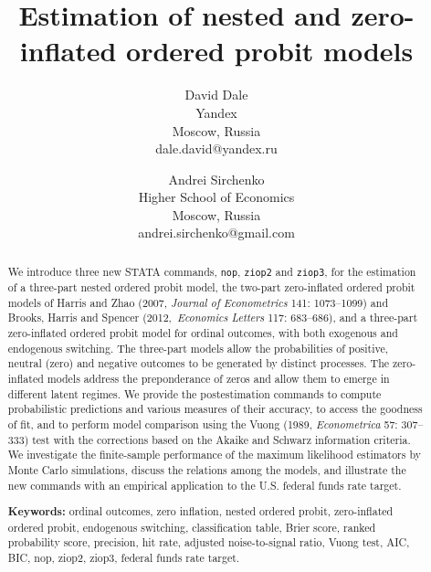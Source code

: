 \documentclass[letterpaper,fleqn,12pt]{article}
\begin{document}
\title{Estimation of nested and zero-inflated ordered probit models\\
\bigskip }
\date{}
\author{David Dale \\
Yandex\\
Moscow, Russia\\
dale.david@yandex.ru \and Andrei Sirchenko \\
Higher School of Economics\\
Moscow, Russia\\
andrei.sirchenko@gmail.com}
\maketitle

\begin{abstract}
We introduce three new STATA commands, \texttt{nop}, \texttt{ziop2} and 
\texttt{ziop3}, for the estimation of a three-part nested ordered probit
model, the two-part zero-inflated ordered probit models of Harris and Zhao
(2007, \textit{Journal of Econometrics }141: 1073--1099) and Brooks, Harris
and Spencer (2012,\ \textit{Economics Letters} 117: 683--686), and a
three-part zero-inflated ordered probit model for ordinal outcomes, with
both exogenous and endogenous switching. The three-part models allow the
probabilities of positive, neutral (zero) and negative outcomes to be
generated by distinct processes. The zero-inflated models address the
preponderance of zeros and allow them to emerge in different latent regimes.
We provide the postestimation commands to compute probabilistic predictions
and various measures of their accuracy, to access the goodness of fit, and
to perform model comparison using the Vuong (1989, \textit{Econometrica} 57:
307--333) test with the corrections based on the Akaike and Schwarz
information criteria. We investigate the finite-sample performance of the
maximum likelihood estimators by Monte Carlo simulations, discuss the
relations among the models, and illustrate the new commands with an
empirical application to the U.S. federal funds rate target.

\bigskip \bigskip \bigskip \bigskip \bigskip \bigskip \bigskip

\bigskip \bigskip \bigskip \bigskip

\bigskip \bigskip \bigskip \bigskip \bigskip \bigskip \bigskip

\textbf{Keywords:} ordinal outcomes, zero inflation, nested ordered probit,
zero-inflated ordered probit, endogenous switching, classification table,
Brier score, ranked probability score, precision, hit rate, adjusted
noise-to-signal ratio, Vuong test, AIC, BIC, nop, ziop2, ziop3, federal
funds rate target.

\bigskip \bigskip \bigskip \bigskip \bigskip
\end{abstract}
\end{document}

